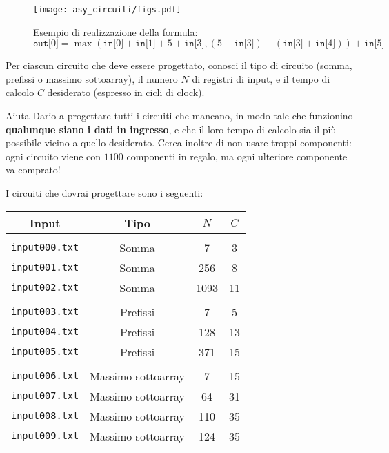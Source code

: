 \begin{figure}[t]%
	\centering\texttt{[image: asy\_circuiti/figs.pdf]}
	\caption{Esempio di realizzazione della formula:
	\[
	\texttt{out[$0$]} = \max(\texttt{in[$0$]} + \texttt{in[$1$]} + 5 + \texttt{in[$3$]},
	(5 + \texttt{in[$3$]}) - (\texttt{in[$3$]} + \texttt{in[$4$]})) + \texttt{in[$5$]}
	\]} \label{fig}
\end{figure}

Per ciascun circuito che deve essere progettato,
conosci il tipo di circuito (somma, prefissi o massimo sottoarray),
il numero $N$ di registri di input,
e il tempo di calcolo $C$ desiderato (espresso in cicli di clock).

Aiuta Dario a progettare tutti i circuiti che mancano,
in modo tale che funzionino \textbf{qualunque siano i dati in ingresso},
e che il loro tempo di calcolo sia il più possibile vicino a quello desiderato.
Cerca inoltre di non usare troppi componenti: ogni circuito viene con
$1100$ componenti in regalo, ma ogni ulteriore componente va
comprato!

\pagebreak
I circuiti che dovrai progettare sono i seguenti:
\begin{center}
	\begin{tabular}{c|c|c|c}
		\textbf{Input} & \textbf{Tipo} & $N$ & $C$ \\[5pt]
		\hline \\[-10pt]
		\texttt{input000.txt} & Somma & 7 & 3 \\
		\texttt{input001.txt} & Somma & 256 & 8 \\
		\texttt{input002.txt} & Somma & 1093 & 11 \\[5pt]
		\hline \\[-10pt]
		\texttt{input003.txt} & Prefissi & 7 & 5 \\
		\texttt{input004.txt} & Prefissi & 128 & 13 \\
		\texttt{input005.txt} & Prefissi & 371 & 15 \\[5pt]
		\hline \\[-10pt]
		\texttt{input006.txt} & Massimo sottoarray & 7 & 15 \\
		\texttt{input007.txt} & Massimo sottoarray & 64 & 31 \\
		\texttt{input008.txt} & Massimo sottoarray & 110 & 35 \\
		\texttt{input009.txt} & Massimo sottoarray & 124 & 35 \\
	\end{tabular}
\end{center}

